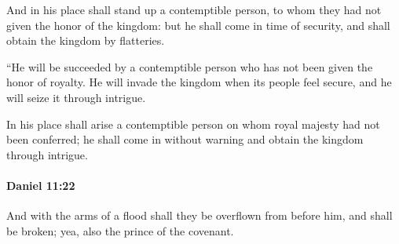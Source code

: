 			\begin{versebox}
					\item[BHS] 
					\item[LXX] 
					\item[ASV] And in his place shall stand up a contemptible person, to whom they had not given the honor of the kingdom: but he shall come in time of security, and shall obtain the kingdom by flatteries.
					\item[NIV] “He will be succeeded by a contemptible person who has not been given the honor of royalty. He will invade the kingdom when its people feel secure, and he will seize it through intrigue.
					\item[NRSV] In his place shall arise a contemptible person on whom royal majesty had not been conferred; he shall come in without warning and obtain the kingdom through intrigue.
			\end{versebox}

		\paragraph{Daniel 11:22} %
			\label{DANIEL-11-22}

			And with the arms of a flood shall they be overflown from before him, and shall be broken; yea, also the prince of the covenant.

